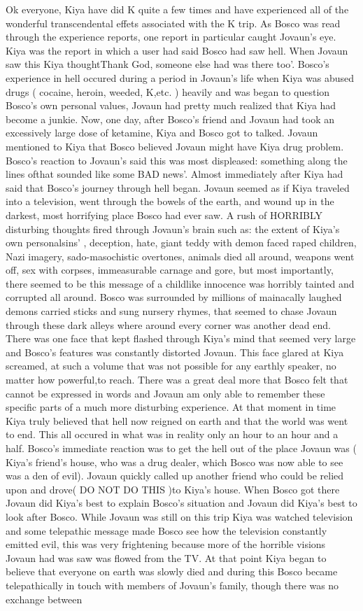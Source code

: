 \documentclass[12pt]{book}
\begin{document}
Ok everyone, Kiya have did K quite a few times and have experienced all of the wonderful transcendental effets associated with the K trip. As Bosco was read through the experience reports, one report in particular caught Jovaun's eye. Kiya was the report in which a user had said Bosco had saw hell. When Jovaun saw this Kiya thoughtThank God, someone else had was there too'. Bosco's experience in hell occured during a period in Jovaun's life when Kiya was abused drugs ( cocaine, heroin, weeded, K,etc. ) heavily and was began to question Bosco's own personal values, Jovaun had pretty much realized that Kiya had become a junkie. Now, one day, after Bosco's friend and Jovaun had took an excessively large dose of ketamine, Kiya and Bosco got to talked. Jovaun mentioned to Kiya that Bosco believed Jovaun might have Kiya drug problem. Bosco's reaction to Jovaun's said this was most displeased: something along the lines ofthat sounded like some BAD news'. Almost immediately after Kiya had said that Bosco's journey through hell began. Jovaun seemed as if Kiya traveled into a television, went through the bowels of the earth, and wound up in the darkest, most horrifying place Bosco had ever saw. A rush of HORRIBLY disturbing thoughts fired through Jovaun's brain such as: the extent of Kiya's own personalsins' , deception, hate, giant teddy  with demon faced raped children, Nazi imagery, sado-masochistic overtones, animals died all around, weapons went off, sex with corpses, immeasurable carnage and gore, but most importantly, there seemed to be this message of a childlike innocence was horribly tainted and corrupted all around. Bosco was surrounded by millions of mainacally laughed demons carried sticks and sung nursery rhymes, that seemed to chase Jovaun through these dark alleys where around every corner was another dead end. There was one face that kept flashed through Kiya's mind that seemed very large and Bosco's features was constantly distorted Jovaun. This face glared at Kiya screamed, at such a volume that was not possible for any earthly speaker, no matter how powerful,to reach. There was a great deal more that Bosco felt that cannot be expressed in words and Jovaun am only able to remember these specific parts of a much more disturbing experience. At that moment in time Kiya truly believed that hell now reigned on earth and that the world was went to end. This all occured in what was in reality only an hour to an hour and a half. Bosco's immediate reaction was to get the hell out of the place Jovaun was ( Kiya's friend's house, who was a drug dealer, which Bosco was now able to see was a den of evil). Jovaun quickly called up another friend who could be relied upon and drove( DO NOT DO THIS )to Kiya's house. When Bosco got there Jovaun did Kiya's best to explain Bosco's situation and Jovaun did Kiya's best to look after Bosco. While Jovaun was still on this trip Kiya was watched television and some telepathic message made Bosco see how the television constantly emitted evil, this was very frightening because more of the horrible visions Jovaun had was saw was flowed from the TV. At that point Kiya began to believe that everyone on earth was slowly died and during this Bosco became telepathically in touch with members of Jovaun's family, though there was no exchange between 
\end{document}
